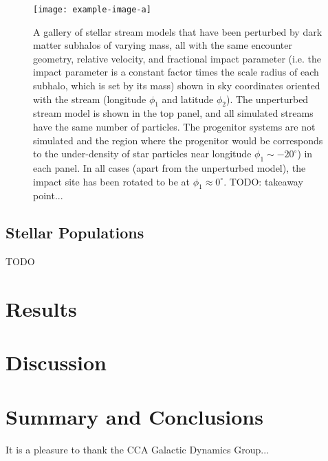 \begin{figure*}[!th]
\begin{center}
\texttt{[image: example-image-a]} %
\end{center}
\caption{%
A gallery of stellar stream models that have been perturbed by dark matter subhalos of
varying mass, all with the same encounter geometry, relative velocity, and fractional
impact parameter (i.e. the impact parameter is a constant factor times the scale radius
of each subhalo, which is set by its mass) shown in sky coordinates oriented with the
stream (longitude $\phi_1$ and latitude $\phi_2$).
The unperturbed stream model is shown in the top panel, and all simulated streams have
the same number of particles.
The progenitor systems are not simulated and the region where the progenitor would be
corresponds to the under-density of star particles near longitude $\phi_1 \sim
-20^\circ$) in each panel.
In all cases (apart from the unperturbed model), the impact site has been rotated to be
at $\phi_1 \approx 0^\circ$.
TODO: takeaway point...
\label{fig:simgallery}
}
\end{figure*}

\subsection{Stellar Populations} \label{sec:stellarpops}

TODO

\section{Results} \label{sec:results}


\section{Discussion} \label{sec:discussion}


\section{Summary and Conclusions} \label{sec:conclusions}


\begin{acknowledgements}

It is a pleasure to thank the CCA Galactic Dynamics Group...


\end{acknowledgements}






